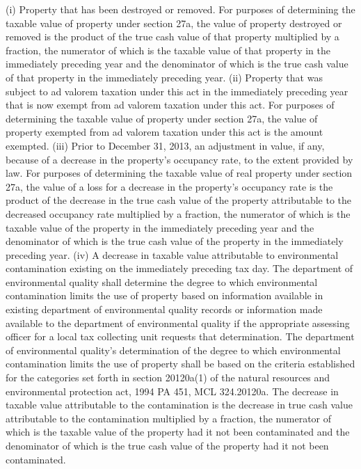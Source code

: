 \documentclass[12pt,\documentclassflag]{michiganCourtOfAppealsBrief}
\begin{document}
  (i) Property that has been destroyed or removed. For purposes of determining the taxable value of property under section 27a, the value of property destroyed or removed is the product of the true cash value of that property multiplied by a fraction, the numerator of which is the taxable value of that property in the immediately preceding year and the denominator of which is the true cash value of that property in the immediately preceding year.
  (ii) Property that was subject to ad valorem taxation under this act in the immediately preceding year that is now exempt from ad valorem taxation under this act. For purposes of determining the taxable value of property under section 27a, the value of property exempted from ad valorem taxation under this act is the amount exempted.
  (iii) Prior to December 31, 2013, an adjustment in value, if any, because of a decrease in the property's occupancy rate, to the extent provided by law. For purposes of determining the taxable value of real property under section 27a, the value of a loss for a decrease in the property's occupancy rate is the product of the decrease in the true cash value of the property attributable to the decreased occupancy rate multiplied by a fraction, the numerator of which is the taxable value of the property in the immediately preceding year and the denominator of which is the true cash value of the property in the immediately preceding year.
  (iv) A decrease in taxable value attributable to environmental contamination existing on the immediately preceding tax day. The department of environmental quality shall determine the degree to which environmental contamination limits the use of property based on information available in existing department of environmental quality records or information made available to the department of environmental quality if the appropriate assessing officer for a local tax collecting unit requests that determination. The department of environmental quality's determination of the degree to which environmental contamination limits the use of property shall be based on the criteria established for the categories set forth in section 20120a(1) of the natural resources and environmental protection act, 1994 PA 451, MCL 324.20120a. The decrease in taxable value attributable to the contamination is the decrease in true cash value attributable to the contamination multiplied by a fraction, the numerator of which is the taxable value of the property had it not been contaminated and the denominator of which is the true cash value of the property had it not been contaminated.
\end{document}
